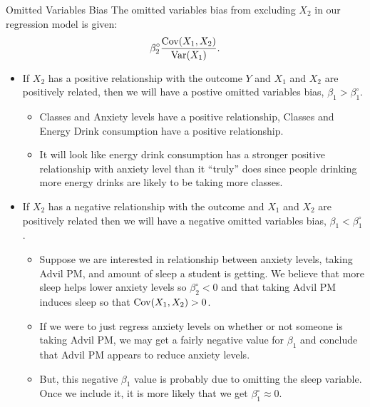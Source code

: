 \documentclass[notheorems, 9pt]{beamer}
\begin{document}
\begin{frame}{Omitted Variables Bias} %
	\label{frame:omitted3} %
	\onslide<1->
	The omitted variables bias from excluding \(X_2\) in our regression model is given:
	\[
		\beta_2^\circ\frac{\operatorname{Cov}(X_1,X_2)}{\operatorname{Var}(X_1)} 
	.\]
	\begin{itemize}
		\item<1|only@1> If \(X_2\) has a positive relationship with the outcome \(Y\) and  \(X_1\) and  \(X_2\) are positively related, then we will have a postive omitted variables bias, \(\beta_1 > \beta_1^\circ\).
		\begin{itemize}
			\item Classes and Anxiety levels have a positive relationship, Classes and Energy Drink consumption have a positive relationship.
		    \item It will look like energy drink consumption has a stronger positive relationship with anxiety level than it ``truly'' does since people drinking more energy drinks are likely to be taking more classes.
		\end{itemize}
		\item<2|only@2> If \(X_2\) has a negative relationship with the outcome and  \(X_1\) and  \(X_2\) are positively related then we will have a negative omitted variables bias,  \(\beta_1 < \beta_1^\circ\).
		\begin{itemize}
			\item Suppose we are interested in relationship between anxiety levels, taking Advil PM, and amount of sleep a student is getting. We believe that more sleep helps lower anxiety levels so \(\beta_2^\circ < 0\) and that taking Advil PM induces sleep so that \(\operatorname{Cov}(X_1,X_2) > 0\).
			\item If we were to just regress anxiety levels on whether or not someone is taking Advil PM, we may get a fairly negative value for \(\beta_1\) and conclude that Advil PM appears to reduce anxiety levels.
		    \item But, this negative \(\beta_1\) value is probably due to omitting the sleep variable. Once we include it, it is more likely that we get \(\beta_1^\circ \approx 0\).
		\end{itemize}
	\end{itemize}
\end{frame}
\end{document}
